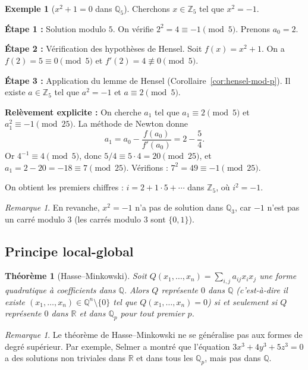 \documentclass[12pt,a4paper,openany]{book}
\theoremstyle{definition}
\newtheorem{exemple}[definition]{Exemple}
\theoremstyle{plain}
\newtheorem{theoreme}[definition]{Théorème}
\theoremstyle{remark}
\newtheorem{remarque}[definition]{Remarque}
\newcommand{\Z}{\mathbb{Z}}
\newcommand{\Q}{\mathbb{Q}}
\newcommand{\R}{\mathbb{R}}
\begin{document}
\begin{exemple}[{$x^2 + 1 = 0$ dans $\Q_5$}]
\label{ex:x2-plus-1-Q5}
Cherchons $x \in \Z_5$ tel que $x^2 = -1$.

\textbf{Étape 1 :} Solution modulo $5$. On vérifie $2^2 = 4 \equiv -1 \pmod{5}$.
Prenons $a_0 = 2$.

\textbf{Étape 2 :} Vérification des hypothèses de Hensel. Soit $f(x) = x^2 + 1$.
On a $f(2) = 5 \equiv 0 \pmod{5}$ et $f'(2) = 4 \not\equiv 0 \pmod{5}$.

\textbf{Étape 3 :} Application du lemme de Hensel (Corollaire~\ref{cor:hensel-mod-p}).
Il existe $a \in \Z_5$ tel que $a^2 = -1$ et $a \equiv 2 \pmod{5}$.

\textbf{Relèvement explicite :}
On cherche $a_1$ tel que $a_1 \equiv 2 \pmod{5}$ et $a_1^2 \equiv -1 \pmod{25}$.
La méthode de Newton donne
\[
  a_1 = a_0 - \frac{f(a_0)}{f'(a_0)} = 2 - \frac{5}{4}.
\]
Or $4^{-1} \equiv 4 \pmod{5}$, donc $5/4 \equiv 5 \cdot 4 = 20 \pmod{25}$, et
$a_1 = 2 - 20 = -18 \equiv 7 \pmod{25}$. Vérifions : $7^2 = 49 \equiv -1 \pmod{25}$.

On obtient les premiers chiffres : $i = 2 + 1 \cdot 5 + \cdots$ dans $\Z_5$,
où $i^2 = -1$.
\end{exemple}

\begin{remarque}
\label{rem:x2-moins1-Q3}
En revanche, $x^2 = -1$ n'a pas de solution dans $\Q_3$, car $-1$ n'est pas un
carré modulo $3$ (les carrés modulo $3$ sont $\{0, 1\}$).
\end{remarque}

\subsection{Principe local-global}
\label{subsec:local-global}

\begin{theoreme}[Hasse--Minkowski]
\label{thm:hasse-minkowski}
Soit $Q(x_1, \ldots, x_n) = \sum_{i,j} a_{ij} x_i x_j$ une forme quadratique
à coefficients dans $\Q$. Alors $Q$ représente $0$ dans $\Q$ (c'est-à-dire
il existe $(x_1, \ldots, x_n) \in \Q^n \setminus \{0\}$ tel que $Q(x_1, \ldots, x_n) = 0$)
si et seulement si $Q$ représente $0$ dans $\R$ et dans $\Q_p$ pour tout premier $p$.
\end{theoreme}

\begin{remarque}
\label{rem:local-global-limitation}
Le théorème de Hasse--Minkowski ne se généralise pas aux formes de degré supérieur.
Par exemple, Selmer a montré que l'équation $3x^3 + 4y^3 + 5z^3 = 0$
a des solutions non triviales dans $\R$ et dans tous les $\Q_p$, mais pas dans $\Q$.
\end{remarque}
\end{document}
